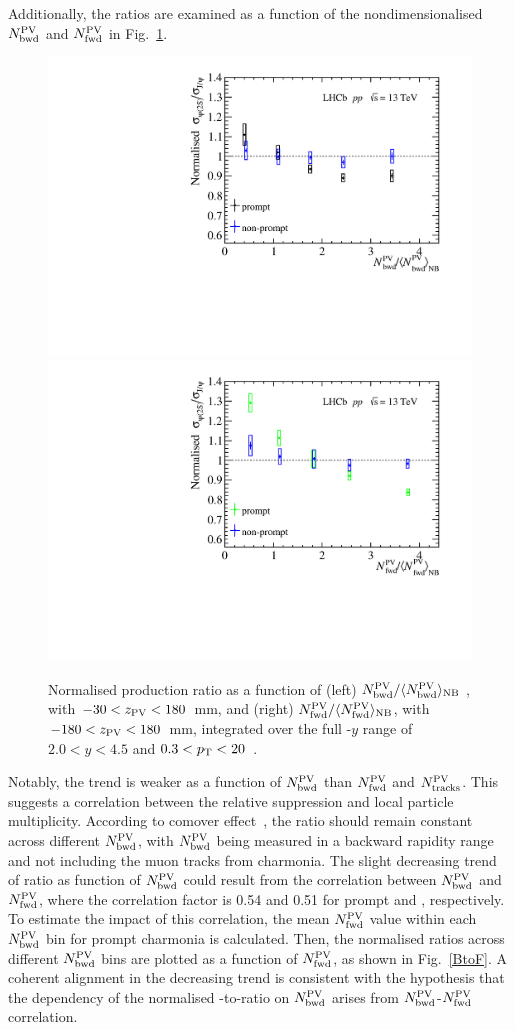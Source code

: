 \documentclass[12pt,a4paper]{article}
\begin{document}
Additionally, the ratios are examined as a function of the nondimensionalised $N_{\rm bwd}^{\rm PV}$ and $N_{\rm fwd}^{\rm PV}$ in Fig.~\ref{RatioFB}. 
\begin{figure}[H]
  \begin{center}
    \includegraphics[width=0.49\linewidth]{pdf/Result/AllB.pdf}
    \includegraphics[width=0.49\linewidth]{pdf/Result/AllF.pdf}
    \vspace*{-0.5cm}
  \end{center}
	\caption{Normalised production ratio as a function of (left) $N_{\rm bwd}^{\rm PV}/\langle N_{\rm bwd}^{\rm PV}\rangle_{\rm{NB}}$ , with $-30<z_{\rm PV}<180$~mm, and (right) $N_{\rm fwd}^{\rm PV}/\langle N_{\rm fwd}^{\rm PV}\rangle_{\rm{NB}}$, with $-180<z_{\rm PV}<180$~mm, integrated over the full \pt-$y$ range of $2.0<y<4.5$ and $0.3<p_{\mathrm{T}}<20$~\gevc.
    }
  \label{RatioFB}
\end{figure}
Notably, the trend is weaker as a function of $N_{\rm bwd}^{\rm PV}$ than $N_{\rm fwd}^{\rm PV}$ and  $N_{\rm tracks}^{\rm PV}$. This suggests a correlation between the relative suppression and local particle multiplicity. According to comover effect~\cite{Ferreiro:2012rq}, the ratio should remain constant across different $N_{\rm bwd}^{\rm PV}$, with $N_{\rm bwd}^{\rm PV}$ being measured in a backward rapidity range and not including the muon tracks from charmonia. The slight decreasing trend of ratio as function of $N_{\rm bwd}^{\rm PV}$ could result from the correlation between $N_{\rm bwd}^{\rm PV}$ and $N_{\rm fwd}^{\rm PV}$, where the correlation factor is 0.54 and 0.51 for prompt \jpsi and \psitwos, respectively. To estimate the impact of this correlation, the mean $N_{\rm fwd}^{\rm PV}$ value within each $N_{\rm bwd}^{\rm PV}$ bin for prompt charmonia is calculated. Then, the normalised ratios across different $N_{\rm bwd}^{\rm PV}$ bins are plotted as a function of $N_{\rm fwd}^{\rm PV}$, as shown in Fig.~\ref{BtoF}. A coherent alignment in the decreasing trend is consistent with the hypothesis that the dependency of the normalised \psitwos-to-\jpsi ratio on $N_{\rm bwd}^{\rm PV}$ arises from $N_{\rm bwd}^{\rm PV}$-$N_{\rm fwd}^{\rm PV}$ correlation. 
\end{document}
